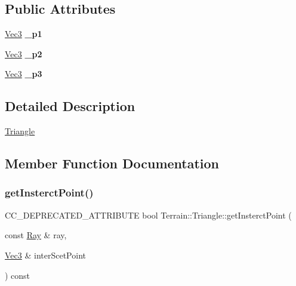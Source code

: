 \subsection*{Public Attributes}
\begin{DoxyCompactItemize}
\item 
\mbox{\label{structTerrain_1_1Triangle_a8278698b3a61080360c4243908744e54}} 
\hyperlink{classVec3}{Vec3} {\bfseries \+\_\+p1}
\item 
\mbox{\label{structTerrain_1_1Triangle_a4458b8817b7552e223a2f5383cff039f}} 
\hyperlink{classVec3}{Vec3} {\bfseries \+\_\+p2}
\item 
\mbox{\label{structTerrain_1_1Triangle_aa9d314c11ec3082a721ab05d705c9cb9}} 
\hyperlink{classVec3}{Vec3} {\bfseries \+\_\+p3}
\end{DoxyCompactItemize}


\subsection{Detailed Description}
\hyperlink{structTerrain_1_1Triangle}{Triangle} 

\subsection{Member Function Documentation}
\mbox{\label{structTerrain_1_1Triangle_a9b2fcc5f46f1ee2cb5d59f4f562c4e30}} 
\subsubsection{\texorpdfstring{get\+Insterct\+Point()}{getInsterctPoint()}}
{\footnotesize\ttfamily C\+C\+\_\+\+D\+E\+P\+R\+E\+C\+A\+T\+E\+D\+\_\+\+A\+T\+T\+R\+I\+B\+U\+TE bool Terrain\+::\+Triangle\+::get\+Insterct\+Point (\begin{DoxyParamCaption}\item[{const \hyperlink{classRay}{Ray} \&}]{ray,  }\item[{\hyperlink{classVec3}{Vec3} \&}]{inter\+Scet\+Point }\end{DoxyParamCaption}) const}

